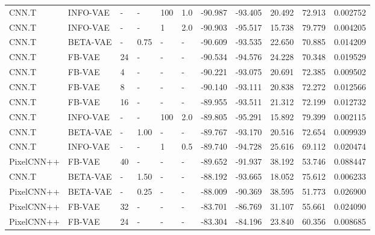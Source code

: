 \begin{table}[!htb]
\begin{tabular}{llllll|rrrrr}
      CNN.T &  INFO-VAE &         - &      - &   100 &  1.0 &      -90.987 &      -93.405 &      20.492 &      72.913 &   0.002752 \\
      CNN.T &  INFO-VAE &         - &      - &     1 &  2.0 &      -90.903 &      -95.517 &      15.738 &      79.779 &   0.004205 \\
      CNN.T &  BETA-VAE &         - &  0.75 &     - &      - &      -90.609 &      -93.535 &      22.650 &      70.885 &   0.014209 \\
      CNN.T &    FB-VAE &        24 &      - &     - &      - &      -90.534 &      -94.576 &      24.228 &      70.348 &   0.019529 \\
      CNN.T &    FB-VAE &         4 &      - &     - &      - &      -90.221 &      -93.075 &      20.691 &      72.385 &   0.009502 \\
      CNN.T &    FB-VAE &         8 &      - &     - &      - &      -90.140 &      -93.111 &      20.838 &      72.272 &   0.012566 \\
      CNN.T &    FB-VAE &        16 &      - &     - &      - &      -89.955 &      -93.511 &      21.312 &      72.199 &   0.012732 \\
      CNN.T &  INFO-VAE &         - &      - &   100 &  2.0 &      -89.805 &      -95.291 &      15.892 &      79.399 &   0.002115 \\
      CNN.T &  BETA-VAE &         - &  1.00 &     - &      - &      -89.767 &      -93.170 &      20.516 &      72.654 &   0.009939 \\
      CNN.T &  INFO-VAE &         - &      - &     1 &  0.5 &      -89.740 &      -94.728 &      25.616 &      69.112 &   0.020474 \\
 PixelCNN++ &    FB-VAE &        40 &      - &     - &      - &      -89.652 &      -91.937 &      38.192 &      53.746 &   0.088447 \\
      CNN.T &  BETA-VAE &         - &  1.50 &     - &      - &      -88.192 &      -93.665 &      18.052 &      75.612 &   0.006233 \\
 PixelCNN++ &  BETA-VAE &         - &  0.25 &     - &      - &      -88.009 &      -90.369 &      38.595 &      51.773 &   0.026900 \\
 PixelCNN++ &    FB-VAE &        32 &      - &     - &      - &      -83.701 &      -86.769 &      31.107 &      55.661 &   0.024090 \\
 PixelCNN++ &    FB-VAE &        24 &      - &     - &      - &      -83.304 &      -84.196 &      23.840 &      60.356 &   0.008685 \\

\end{tabular}
\end{table}
